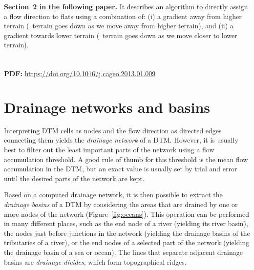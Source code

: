 \begin{kaobox}[frametitle=\faExternalLink\ To read or to watch.]
\textbf{Section~2 in the following paper.} 
It describes an algorithm to directly assign a flow direction to flats using a combination of: (i) a gradient away from higher terrain (\ie\ terrain goes down as we move away from higher terrain), and (ii) a gradient towards lower terrain (\ie\ terrain goes down as we move closer to lower terrain).
\\
\\
\\
\textbf{PDF:} \url{https://doi.org/10.1016/j.cageo.2013.01.009}
\end{kaobox}

\section{Drainage networks and basins}

Interpreting DTM cells as nodes and the flow direction as directed edges connecting them yields the \emph{drainage network} of a DTM\@.
However, it is usually best to filter out the least important parts of the network using a flow accumulation threshold.
A good rule of thumb for this threshold is the mean flow accumulation in the DTM, but an exact value is usually set by trial and error until the desired parts of the network are kept.

Based on a computed drainage network, it is then possible to extract the \emph{drainage basins} of a DTM by considering the areas that are drained by one or more nodes of the network (Figure~\ref{fig:oceans}).
This operation can be performed in many different places, such as the end node of a river (yielding its river basin), the nodes just before junctions in the network (yielding the drainage basins of the tributaries of a river), or the end nodes of a selected part of the network (yielding the drainage basin of a sea or ocean).
The lines that separate adjacent drainage basins are \emph{drainage divides}, which form topographical ridges.

